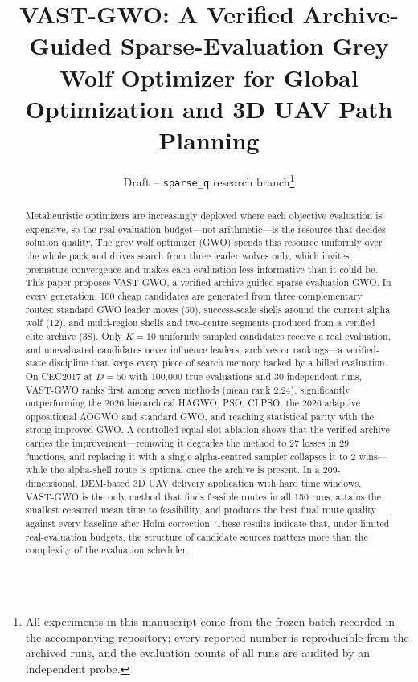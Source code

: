 \documentclass[journal]{IEEEtran}
\newcommand{\method}{VAST-GWO}
\begin{document}
\title{\method{}: A Verified Archive-Guided Sparse-Evaluation Grey Wolf
Optimizer for Global Optimization and 3D UAV Path Planning}

\author{Draft -- \texttt{sparse\_q} research branch\thanks{All experiments in
this manuscript come from the frozen batch recorded in the accompanying
repository; every reported number is reproducible from the archived runs, and
the evaluation counts of all runs are audited by an independent probe.}}

\maketitle

\begin{abstract}
Metaheuristic optimizers are increasingly deployed where each objective
evaluation is expensive, so the real-evaluation budget---not arithmetic---is
the resource that decides solution quality. The grey wolf optimizer (GWO)
spends this resource uniformly over the whole pack and drives search from three
leader wolves only, which invites premature convergence and makes each
evaluation less informative than it could be. This paper proposes
\method{}, a verified archive-guided sparse-evaluation GWO. In every
generation, 100 cheap candidates are generated from three complementary
routes: standard GWO leader moves (50), success-scale shells around the
current alpha wolf (12), and multi-region shells and two-centre segments
produced from a verified elite archive (38). Only $K=10$ uniformly sampled
candidates receive a real evaluation, and unevaluated candidates never
influence leaders, archives or rankings---a verified-state discipline that
keeps every piece of search memory backed by a billed evaluation. On CEC2017
at $D=50$ with 100{,}000 true evaluations and 30 independent runs,
\method{} ranks first among seven methods (mean rank 2.24), significantly
outperforming the 2026 hierarchical HAGWO, PSO, CLPSO, the 2026 adaptive
oppositional AOGWO and standard GWO, and reaching statistical parity with the
strong improved GWO. A controlled equal-slot ablation shows that the verified
archive carries the improvement---removing it degrades the method to 27 losses
in 29 functions, and replacing it with a single alpha-centred sampler
collapses it to 2 wins---while the alpha-shell route is optional once the
archive is present. In a 209-dimensional, DEM-based 3D UAV delivery
application with hard time windows, \method{} is the only method that finds
feasible routes in all 150 runs, attains the smallest censored mean time to
feasibility, and produces the best final route quality against every
baseline after Holm correction. These results indicate that, under limited
real-evaluation budgets, the structure of candidate sources matters more than
the complexity of the evaluation scheduler.
\end{abstract}
\end{document}
